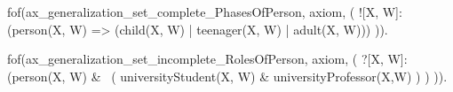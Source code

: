 fof(ax_generalization_set_complete_PhasesOfPerson, axiom, (
  ![X, W]: (person(X, W) => (child(X, W) | teenager(X, W) | adult(X, W)))
)).

fof(ax_generalization_set_incomplete_RolesOfPerson, axiom, (
  ?[X, W]: (person(X, W) & ~( universityStudent(X, W) & universityProfessor(X,W) ) ) 
)).




